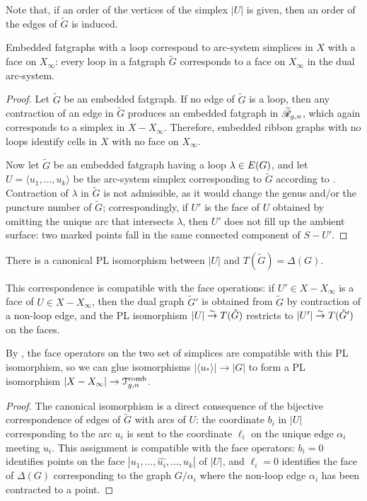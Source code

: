Note that, if an order of the vertices of the simplex $|U|$ is given,
then an order of the edges of ${\tilde G}$ is induced.

\begin{lemma}
  \label{lemma:erg-loop}
  Embedded fatgraphs with a loop correspond to arc-system simplices
  in $X$ with a face on $X_\infty$: every loop in a fatgraph ${\tilde G}$
  corresponds to a face on $X_\infty$ in the dual arc-system.
\end{lemma}
\begin{proof}
  Let ${\tilde G}$ be an embedded fatgraph.  If no edge of
  ${\tilde G}$ is a loop, then any contraction of an edge in ${\tilde
    G}$ produces an embedded fatgraph in $\mathscr{\widetilde R}_{g,n}$, which again
  corresponds to a simplex in $X - X_\infty$.  Therefore, embedded ribbon
  graphs with no loops identify cells in $X$ with no face on $X_\infty$.

  Now let ${\tilde G}$ be an embedded fatgraph having a loop $\lambda \in
  E(G)$, and let $U = \langle u_1, \ldots, u_k\rangle$ be the arc-system simplex
  corresponding to ${\tilde G}$ according to .
  Contraction of $\lambda$ in ${\tilde G}$ is not admissible, as it would
  change the genus and/or the puncture number of ${\tilde G}$;
  correspondingly, if $U'$ is the face of $U$ obtained by omitting the
  unique arc that intersects $\lambda$, then $U'$ does not fill up the
  ambient surface: two marked points fall in the same connected
  component of $S - U'$.
\end{proof}

\begin{lemma}
  \label{lemma:PL-face}
  There is a canonical PL isomorphism between $|U|$ and
  $T({\tilde G}) = \Delta(G)$.

  This correspondence is compatible with the face operations: if $U' \in
  X - X_\infty$ is a face of $U \in X - X_\infty$, then the dual graph ${\tilde
    G}'$ is obtained from ${\tilde G}$ by contraction of a non-loop
  edge, and the PL isomorphism $|U| \stackrel{\sim}{\to} T({\tilde G})$ restricts
  to $|U'| \stackrel{\sim}{\to} T({\tilde G}')$ on the faces.
\end{lemma}
By , the face operators on the two set of
simplices are compatible with this PL isomorphism, so we can glue
isomorphisms $|\langle u_*\rangle| \to |G|$ to form a PL isomorphism $|X - X_\infty| \to
\mathcal{T}\sp{\text{comb}}_{g,n}$.
\begin{proof}
  The canonical isomorphism is a direct consequence of the bijective
  correspondence of edges of ${\tilde G}$ with arcs of $U$: the
  coordinate $b_i$ in $|U|$ corresponding to the arc $u_i$ is sent to
  the coordinate $\ell_i$ on the unique edge $\alpha_i$ meeting $u_i$.  This
  assignment is compatible with the face operators: $b_i=0$ identifies
  points on the face $|u_1, \ldots, \widehat{u_i}, \ldots, u_k|$ of $|U|$, and
  $\ell_i = 0$ identifies the face of $\Delta(G)$ corresponding to the graph
  $G/\alpha_i$ where the non-loop edge $\alpha_i$ has been contracted to a point.
\end{proof}


